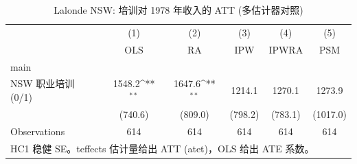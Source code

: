 \begin{table}[htbp]\centering
\def\sym#1{\ifmmode^{#1}\else\(^{#1}\)\fi}
\caption{Lalonde NSW: 培训对 1978 年收入的 ATT (多估计器对照)}
\begin{tabular}{l*{5}{c}}
\toprule
                    &\multicolumn{1}{c}{(1)}&\multicolumn{1}{c}{(2)}&\multicolumn{1}{c}{(3)}&\multicolumn{1}{c}{(4)}&\multicolumn{1}{c}{(5)}\\
                    &\multicolumn{1}{c}{OLS}&\multicolumn{1}{c}{RA}&\multicolumn{1}{c}{IPW}&\multicolumn{1}{c}{IPWRA}&\multicolumn{1}{c}{PSM}\\
\midrule
main                &                     &                     &                     &                     &                     \\
NSW 职业培训 (0/1)  &      1548.2\sym{**} &      1647.6\sym{**} &      1214.1         &      1270.1         &      1273.9         \\
                    &     (740.6)         &     (809.0)         &     (798.2)         &     (783.1)         &    (1017.0)         \\
\midrule
Observations        &         614         &         614         &         614         &         614         &         614         \\
\bottomrule
\multicolumn{6}{l}{\footnotesize HC1 稳健 SE。teffects 估计量给出 ATT (atet)，OLS 给出 ATE 系数。}\\
\end{tabular}
\end{table}

